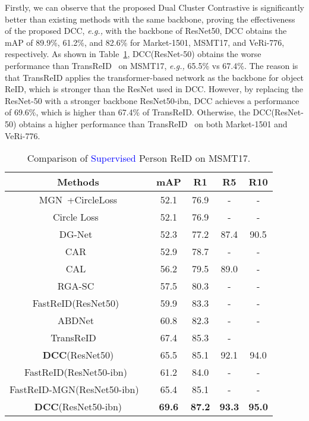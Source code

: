 \documentclass[10pt,twocolumn,letterpaper]{article}
\begin{document}
Firstly, we can observe that the proposed Dual Cluster Contrastive is significantly better than existing methods with the same backbone, proving the effectiveness of the proposed DCC, \emph{e.g.,} with the backbone of ResNet50, DCC obtains the mAP of 89.9\%, 61.2\%, and 82.6\% for Market-1501, MSMT17, and VeRi-776, respectively.
As shown in Table~\ref{tab:supervised_msmt}, DCC(ResNet-50) obtains the worse performance than TransReID~\cite{He_2021_ICCV} on MSMT17, \emph{e.g.,} 65.5\% vs 67.4\%.
The reason is that TransReID applies the transformer-based network as the backbone for object ReID, which is stronger than the ResNet used in DCC.
However, by replacing the ResNet-50 with a stronger backbone ResNet50-ibn, DCC achieves a performance of 69.6\%, which is higher than 67.4\% of TransReID.
Otherwise, the DCC(ResNet-50) obtains a higher performance than TransReID~\cite{He_2021_ICCV} on both Market-1501 and VeRi-776.

\begin{table}
\footnotesize
\begin{center}
\begin{threeparttable}
\begin{tabular}{c|cccc}
\toprule
Methods           & mAP& R1 & R5 & R10\\
\midrule
MGN~\cite{wang2018learning}+CircleLoss & 52.1 & 76.9 & - & -\\
Circle Loss~\cite{sun2020circle} & 52.1&76.9&-&-\\
DG-Net~\cite{zheng2019joint} & 52.3 & 77.2 & 87.4 & 90.5 \\
CAR~\cite{zhou2019omni} & 52.9&78.7&-&-\\
CAL~\cite{DBLP:journals/corr/abs-2108-08728} & 56.2 & 79.5 & 89.0 & -\\
RGA-SC~\cite{DBLP:conf/cvpr/ZhangLZJ020} & 57.5 & 80.3 & -&- \\
FastReID(ResNet50)~\cite{he2020fastreid}& 59.9&83.3&-&-\\
ABDNet~\cite{chen2019abd} & 60.8 & 82.3 & - &-\\
TransReID~\cite{He_2021_ICCV}~\tnote{*} &67.4&85.3&-\\
\textbf{DCC}(ResNet50) &65.5&85.1&92.1&94.0\\
\midrule
FastReID(ResNet50-ibn)~\cite{he2020fastreid}& 61.2&84.0&-&-\\
FastReID-MGN(ResNet50-ibn) ~\cite{wang2018learning}& 65.4 & 85.1 & - & -\\
\textbf{DCC}(ResNet50-ibn) &\textbf{69.6}&\textbf{87.2}&\textbf{93.3}&\textbf{95.0}\\
\bottomrule
\end{tabular}
\end{threeparttable}
\caption{\small Comparison of  \textcolor{blue}{Supervised} Person ReID on MSMT17.}
\label{tab:supervised_msmt}
\end{center}
\end{table}
\end{document}
